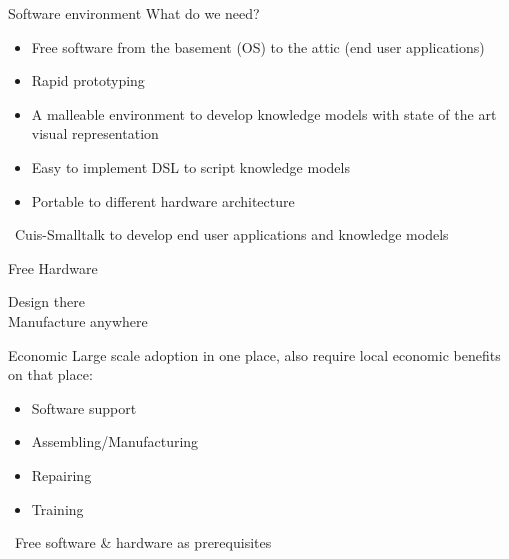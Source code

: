 \documentclass{beamer}
\newcommand{\tip}{\boldmath{\textcolor{red}{$\Rightarrow$}}}
\begin{document}
\begin{frame}{Software environment}
  What do we need?

  \vspace{10pt}
  
  \begin{itemize}
  \item Free software from the basement (OS) to the attic (end user
    applications)
  \item Rapid prototyping
  \item A malleable environment to develop knowledge models with state
    of the art visual representation
  \item Easy to implement DSL to script knowledge models
  \item Portable to different hardware architecture
  \end{itemize}

  \vspace*{10pt}

  \tip\ Cuis-Smalltalk to develop end user applications and knowledge
  models
\end{frame}
%
\begin{frame}{Free Hardware}
  \fontsize{14pt}{8pt}\selectfont
  \begin{center}
    Design there\\
    \vspace*{10pt}
    Manufacture anywhere
  \end{center}
\end{frame}

\begin{frame}{Economic}
  Large scale adoption in one place, also require local economic
  benefits on that place:
  \begin{itemize}
  \item Software support
  \item Assembling/Manufacturing
  \item Repairing
  \item Training
  \end{itemize}

  \vspace*{10pt}
  
  \tip\ Free software \& hardware as prerequisites
  
\end{frame}
\end{document}
